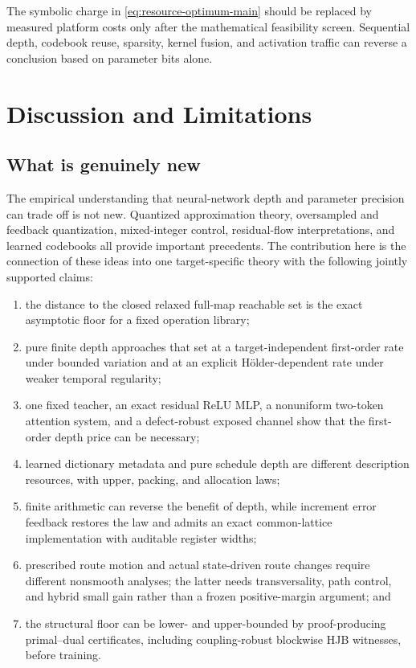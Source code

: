 \documentclass[twoside,11pt]{article}
\begin{document}
The symbolic charge in \eqref{eq:resource-optimum-main} should be replaced by measured platform costs only after the mathematical feasibility screen.  Sequential depth, codebook reuse, sparsity, kernel fusion, and activation traffic can reverse a conclusion based on parameter bits alone.

\section{Discussion and Limitations}
\label{sec:discussion-main}
\label{sec:discussion}

\subsection{What is genuinely new}
\label{sec:novelty-discussion-main}

The empirical understanding that neural-network depth and parameter precision can trade off is not new.  Quantized approximation theory, oversampled and feedback quantization, mixed-integer control, residual-flow interpretations, and learned codebooks all provide important precedents.  
The contribution here is the connection of these ideas into one target-specific theory with the following jointly supported claims:

\begin{enumerate}[leftmargin=1.8em,itemsep=.35em]
\item the distance to the closed relaxed full-map reachable set is the exact asymptotic floor for a fixed operation library;
\item pure finite depth approaches that set at a target-independent first-order rate under bounded variation and at an explicit H\"older-dependent rate under weaker temporal regularity;
\item one fixed teacher, an exact residual ReLU MLP, a nonuniform two-token attention system, and a defect-robust exposed channel show that the first-order depth price can be necessary;
\item learned dictionary metadata and pure schedule depth are different description resources, with upper, packing, and allocation laws;
\item finite arithmetic can reverse the benefit of depth, while increment error feedback restores the law and admits an exact common-lattice implementation with auditable register widths;
\item prescribed route motion and actual state-driven route changes require different nonsmooth analyses; the latter needs transversality, path control, and hybrid small gain rather than a frozen positive-margin argument; and
\item the structural floor can be lower- and upper-bounded by proof-producing primal--dual certificates, including coupling-robust blockwise HJB witnesses, before training.
\end{enumerate}
\end{document}
